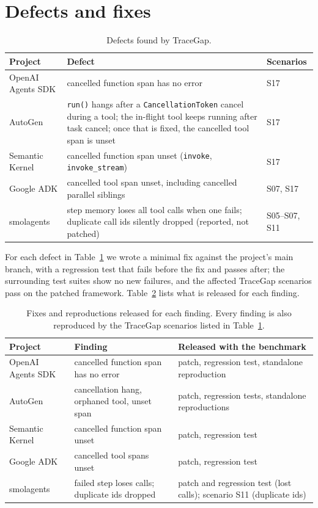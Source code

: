 \documentclass[10pt]{article}
\begin{document}
\section{Defects and fixes}
\label{sec:fixes}

\begin{table}[t]
\centering\small
\begin{tabularx}{\linewidth}{lXl}
\toprule
Project & Defect & Scenarios \\
\midrule
OpenAI Agents SDK & cancelled function span has no error & S17 \\
AutoGen & \texttt{run()} hangs after a \texttt{CancellationToken} cancel during a tool; the in-flight tool keeps running after task cancel; once that is fixed, the cancelled tool span is unset & S17 \\
Semantic Kernel & cancelled function span unset (\texttt{invoke}, \texttt{invoke\_stream}) & S17 \\
Google ADK & cancelled tool span unset, including cancelled parallel siblings & S07, S17 \\
smolagents & step memory loses all tool calls when one fails; duplicate call ids silently dropped (reported, not patched) & S05--S07, S11 \\
\bottomrule
\end{tabularx}
\caption{Defects found by TraceGap.}
\label{tab:fixes}
\end{table}

For each defect in Table~\ref{tab:fixes} we wrote a minimal fix against the project's main branch, with a regression test that fails before the fix and passes after; the surrounding test suites show no new failures, and the affected TraceGap scenarios pass on the patched framework. Table~\ref{tab:upstream} lists what is released for each finding.

\begin{table}[h]
\centering\small
\begin{tabularx}{\linewidth}{llX}
\toprule
Project & Finding & Released with the benchmark \\
\midrule
OpenAI Agents SDK & cancelled function span has no error & patch, regression test, standalone reproduction \\
AutoGen & cancellation hang, orphaned tool, unset span & patch, regression tests, standalone reproductions \\
Semantic Kernel & cancelled function span unset & patch, regression test \\
Google ADK & cancelled tool spans unset & patch, regression test \\
smolagents & failed step loses calls; duplicate ids dropped & patch and regression test (lost calls); scenario S11 (duplicate ids) \\
\bottomrule
\end{tabularx}
\caption{Fixes and reproductions released for each finding. Every finding is also reproduced by the TraceGap scenarios listed in Table~\ref{tab:fixes}.}
\label{tab:upstream}
\end{table}
\end{document}
